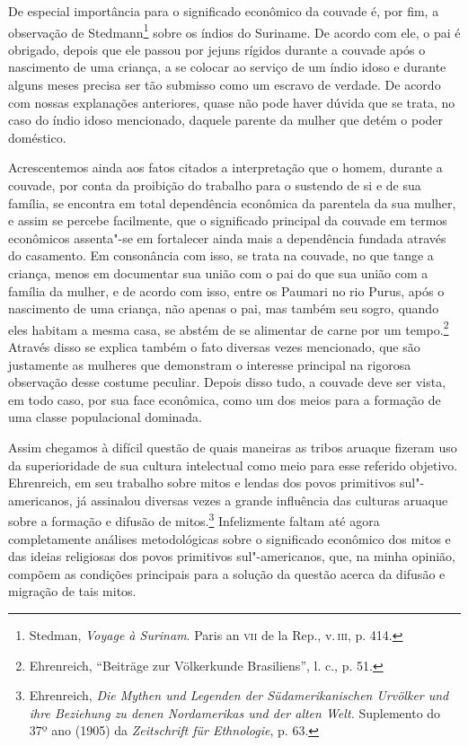 De especial importância para o significado econômico da couvade é, por
fim, a observação de Stedmann\footnote{Stedman, \emph{Voyage à Surinam}.
  Paris an \textsc{vii} de la Rep., v.\,\textsc{iii}, p. 414.} sobre os índios do
Suriname. De acordo com ele, o pai é obrigado, depois que ele passou por
jejuns rígidos durante a couvade após o nascimento de uma criança, a se
colocar ao serviço de um índio idoso e durante alguns meses precisa ser
tão submisso como um escravo de verdade. De acordo com nossas
explanações anteriores, quase não pode haver dúvida que se trata, no
caso do índio idoso mencionado, daquele parente da mulher que detém o
poder doméstico.

Acrescentemos ainda aos fatos citados a interpretação que o homem,
durante a couvade, por conta da proibição do trabalho para o sustendo
de si e de sua família, se encontra em total dependência econômica da
parentela da sua mulher, e assim se percebe facilmente, que o
significado principal da couvade em termos econômicos assenta"-se em
fortalecer ainda mais a dependência fundada através do casamento. Em
consonância com isso, se trata na couvade, no que tange a criança, menos
em documentar sua união com o pai do que sua união com a família da
mulher, e de acordo com isso, entre os Paumari no rio Purus, após o
nascimento de uma criança, não apenas o pai, mas também seu sogro,
quando eles habitam a mesma casa, se abstém de se alimentar de carne por
um tempo.\footnote{Ehrenreich, ``Beiträge zur Völkerkunde Brasiliens'',
  l. c., p. 51.} Através disso se explica também o fato diversas vezes
mencionado, que são justamente as mulheres que demonstram o interesse
principal na rigorosa observação desse costume peculiar. Depois disso
tudo, a couvade deve ser vista, em todo caso, por sua face econômica,
como um dos meios para a formação de uma classe populacional dominada.

Assim chegamos à difícil questão de quais maneiras as tribos aruaque
fizeram uso da superioridade de sua cultura intelectual como meio para
esse referido objetivo. Ehrenreich, em seu trabalho sobre mitos e lendas
dos povos primitivos sul"-americanos, já assinalou diversas vezes a
grande influência das culturas aruaque sobre a formação e difusão de
mitos.\footnote{Ehrenreich, \emph{Die Mythen und Legenden der
  Südamerikanischen Urvölker und ihre Beziehung zu denen Nordamerikas
  und der alten Welt.} Suplemento do 37º ano (1905) da \emph{Zeitschrift
  für Ethnologie}, p. 63.} Infelizmente faltam até agora completamente
análises metodológicas sobre o significado econômico dos mitos e das
ideias religiosas dos povos primitivos sul"-americanos, que, na minha
opinião, compõem as condições principais para a solução da questão
acerca da difusão e migração de tais mitos.

